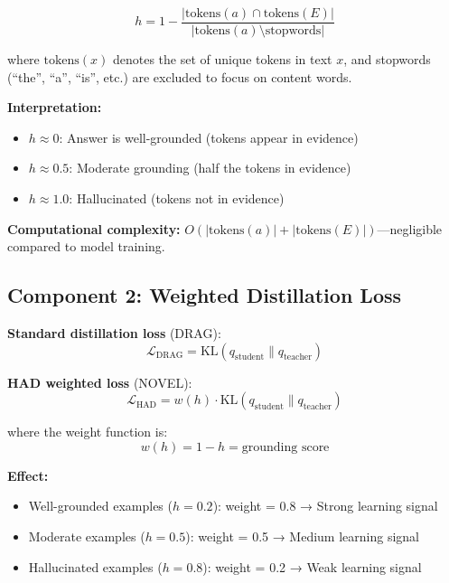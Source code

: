 \documentclass[11pt,a4paper]{article}
\begin{document}
\begin{equation}
h = 1 - \frac{|\text{tokens}(a) \cap \text{tokens}(E)|}{|\text{tokens}(a) \setminus \text{stopwords}|}
\end{equation}

where $\text{tokens}(x)$ denotes the set of unique tokens in text $x$, and stopwords (``the'', ``a'', ``is'', etc.) are excluded to focus on content words.

\textbf{Interpretation:}
\begin{itemize}
    \item $h \approx 0$: Answer is well-grounded (tokens appear in evidence)
    \item $h \approx 0.5$: Moderate grounding (half the tokens in evidence)
    \item $h \approx 1.0$: Hallucinated (tokens not in evidence)
\end{itemize}

\textbf{Computational complexity:} $O(|\text{tokens}(a)| + |\text{tokens}(E)|)$—negligible compared to model training.

\subsection{Component 2: Weighted Distillation Loss}
\label{sec:weighting}

\textbf{Standard distillation loss} (DRAG):
\begin{equation}
\mathcal{L}_{\text{DRAG}} = \text{KL}(q_{\text{student}} \| q_{\text{teacher}})
\end{equation}

\textbf{HAD weighted loss} (NOVEL):
\begin{equation}
\mathcal{L}_{\text{HAD}} = w(h) \cdot \text{KL}(q_{\text{student}} \| q_{\text{teacher}})
\end{equation}

where the weight function is:
\begin{equation}
w(h) = 1 - h = \text{grounding score}
\end{equation}

\textbf{Effect:}
\begin{itemize}
    \item Well-grounded examples ($h=0.2$): weight = 0.8 → Strong learning signal
    \item Moderate examples ($h=0.5$): weight = 0.5 → Medium learning signal
    \item Hallucinated examples ($h=0.8$): weight = 0.2 → Weak learning signal
\end{itemize}
\end{document}
